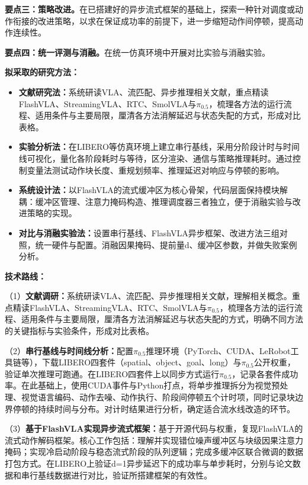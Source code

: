 \textbf{要点三：策略改进。}在已搭建好的异步流式框架的基础上，探索一种针对调度或动作衔接的改进策略，以求在保证成功率的前提下，进一步缩短动作间停顿，提高动作连续性。

\textbf{要点四：统一评测与消融。}在统一仿真环境中开展对比实验与消融实验。


\textbf{拟采取的研究方法：}

\begin{itemize}
  \item \textbf{文献研究法：}系统研读VLA、流匹配、异步推理相关文献，重点精读FlashVLA、StreamingVLA、RTC、SmolVLA与\(\pi_{0.5}\)，梳理各方法的运行流程、适用条件与主要局限，厘清各方法消解延迟与状态失配的方式，形成对比表格。
  \item \textbf{实验分析法：}在LIBERO等仿真环境上建立串行基线，采用分阶段计时与时间线可视化，量化各阶段耗时与等待，区分渲染、通信与策略推理耗时。通过控制变量法测试动作块长度、重规划频率、推理延迟对响应与停顿的影响。
  \item \textbf{系统设计法：}以FlashVLA的流式缓冲区为核心骨架，代码层面保持模块解耦：缓冲区管理、注意力掩码构造、推理调度器三者独立，便于消融实验与改进策略的实现。
  \item \textbf{对比与消融实验法：}设置串行基线、FlashVLA异步框架、改进方法三组对照，统一硬件与配置。消融因果掩码、提前量d、缓冲区参数，并做失败案例分析。
\end{itemize}

\textbf{技术路线：}

（1）\textbf{文献调研：}系统研读VLA、流匹配、异步推理相关文献，理解相关概念。重点精读FlashVLA、StreamingVLA、RTC、SmolVLA与\(\pi_{0.5}\)，梳理各方法的运行流程、适用条件与主要局限，厘清各方法消解延迟与状态失配的方式，明确不同方法的关键指标与实验条件，形成对比表格。

（2）\textbf{串行基线与时间线分析：}配置\(\pi_{0.5}\)推理环境（PyTorch、CUDA、LeRobot工具链等），下载LIBERO四套件（spatial、object、goal、long）与\(\pi_{0.5}\)公开权重，验证单次推理可跑通。在LIBERO四套件上以同步方式运行\(\pi_{0.5}\)，记录各套件成功率。在此基础上，使用CUDA事件与Python打点，将单步推理拆分为视觉预处理、视觉语言编码、动作去噪、动作执行、阶段间停顿五个计时项，同时记录块边界停顿的持续时间与分布。对计时结果进行分析，确定适合流水线改造的环节。

（3）\textbf{基于FlashVLA实现异步流式框架：}基于开源代码与权重，复现FlashVLA的流式动作解码框架。核心工作包括：理解并实现错位噪声缓冲区与块级因果注意力掩码；实现冷启动阶段与稳态流式阶段的队列逻辑；完成多缓冲区联合微调的数据打包方式。在LIBERO上验证d=1异步延迟下的成功率与单步耗时，分别与论文数据和串行基线数据进行对比，验证所搭建框架的有效性。


